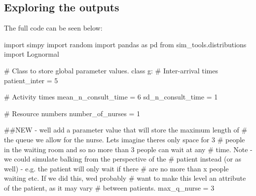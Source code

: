 \documentclass[
  letterpaper,
  DIV=11,
  numbers=noendperiod]{scrreprt}
\newenvironment{Shaded}{\begin{snugshade}}{\end{snugshade}}
\newcommand{\CommentTok}[1]{\textcolor[rgb]{0.37,0.37,0.37}{#1}}
\newcommand{\DecValTok}[1]{\textcolor[rgb]{0.68,0.00,0.00}{#1}}
\newcommand{\ImportTok}[1]{\textcolor[rgb]{0.00,0.46,0.62}{#1}}
\newcommand{\KeywordTok}[1]{\textcolor[rgb]{0.00,0.23,0.31}{#1}}
\newcommand{\NormalTok}[1]{\textcolor[rgb]{0.00,0.23,0.31}{#1}}
\newcommand{\OperatorTok}[1]{\textcolor[rgb]{0.37,0.37,0.37}{#1}}
\begin{document}
\subsection{Exploring the outputs}\label{exploring-the-outputs-1}

The full code can be seen below:

\begin{tcolorbox}[enhanced jigsaw, rightrule=.15mm, colback=white, colframe=quarto-callout-note-color-frame, colbacktitle=quarto-callout-note-color!10!white, toprule=.15mm, coltitle=black, opacityback=0, titlerule=0mm, bottomtitle=1mm, breakable, title=\textcolor{quarto-callout-note-color}{\faInfo}\hspace{0.5em}{Note}, opacitybacktitle=0.6, toptitle=1mm, arc=.35mm, bottomrule=.15mm, leftrule=.75mm, left=2mm]

\begin{Shaded}
\begin{Highlighting}[]
\ImportTok{import}\NormalTok{ simpy}
\ImportTok{import}\NormalTok{ random}
\ImportTok{import}\NormalTok{ pandas }\ImportTok{as}\NormalTok{ pd}
\ImportTok{from}\NormalTok{ sim\_tools.distributions }\ImportTok{import}\NormalTok{ Lognormal}

\CommentTok{\# Class to store global parameter values.}
\KeywordTok{class}\NormalTok{ g:}
    \CommentTok{\# Inter{-}arrival times}
\NormalTok{    patient\_inter }\OperatorTok{=} \DecValTok{5}

    \CommentTok{\# Activity times}
\NormalTok{    mean\_n\_consult\_time }\OperatorTok{=} \DecValTok{6}
\NormalTok{    sd\_n\_consult\_time }\OperatorTok{=} \DecValTok{1}

    \CommentTok{\# Resource numbers}
\NormalTok{    number\_of\_nurses }\OperatorTok{=} \DecValTok{1}

    \CommentTok{\#\#NEW {-} we\textquotesingle{}ll add a parameter value that will store the maximum length of}
    \CommentTok{\# the queue we allow for the nurse.  Let\textquotesingle{}s imagine there\textquotesingle{}s only space for 3}
    \CommentTok{\# people in the waiting room and so no more than 3 people can wait at any}
    \CommentTok{\# time.  Note {-} we could simulate balking from the perspective of the}
    \CommentTok{\# patient instead (or as well) {-} e.g. the patient will only wait if there}
    \CommentTok{\# are no more than x people waiting etc.  If we did this, we\textquotesingle{}d probably}
    \CommentTok{\# want to make this level an attribute of the patient, as it may vary}
    \CommentTok{\# between patients.}
\NormalTok{    max\_q\_nurse }\OperatorTok{=} \DecValTok{3}


\end{Highlighting}
\end{Shaded}
\end{tcolorbox}
\end{document}
